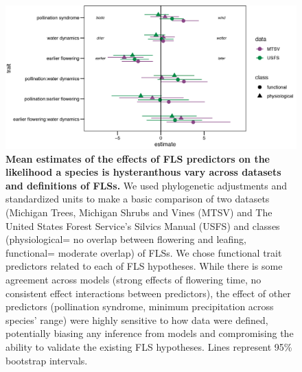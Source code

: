 \documentclass[11pt]{article}
\begin{document}
\begin{figure}[H]
\centering
\includegraphics[width=\textwidth]{..//..//MTSV_USFS/MTSV_USFS.png} 
\caption{\textbf{Mean estimates of the effects of FLS predictors on the likelihood a species is hysteranthous vary across datasets and definitions of FLSs.}  We used phylogenetic adjustments and standardized units to make a basic comparison of two datasets (Michigan Trees, Michigan Shrubs and Vines (MTSV) \citep{Barnes2004,Barnes2016} and The United States Forest Service's Silvics Manual (USFS) \citep{Burns1990} and classes (physiological= no overlap between flowering and leafing, functional= moderate overlap) of FLSs. We chose functional trait predictors related to each of FLS hypotheses. While there is some agreement across models (strong effects of flowering time, no consistent effect interactions between predictors), the effect of other predictors (pollination syndrome, minimum precipitation across species' range) were highly sensitive to how data were defined, potentially biasing any inference from models and compromising the ability to validate the existing FLS hypotheses. Lines represent 95\% bootstrap intervals.}
\label{fig:muplots.USMT}
\end{figure}
\end{document}
